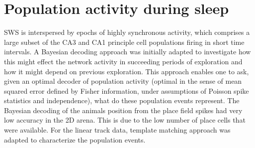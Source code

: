 \section{Population activity during sleep}

SWS is interspersed by epochs of highly synchronous activity, which comprises a large subset of the CA3 and CA1 principle cell populations firing in short time intervals. A Bayesian decoding approach was initially adapted to investigate how this might effect the network activity in succeeding periods of exploration and how it might depend on previous exploration. This approach enables one to ask, given an optimal decoder of population activity (optimal in the sense of mean squared error defined by Fisher information, under assumptions of Poisson spike statistics  and independence), what do these population events represent. The Bayesian decoding of the animals position from the place field spikes had very low accuracy in the 2D arena. This is due to the low number of place cells that were available. For the linear track data, template matching approach was adapted to characterize the population events. 


